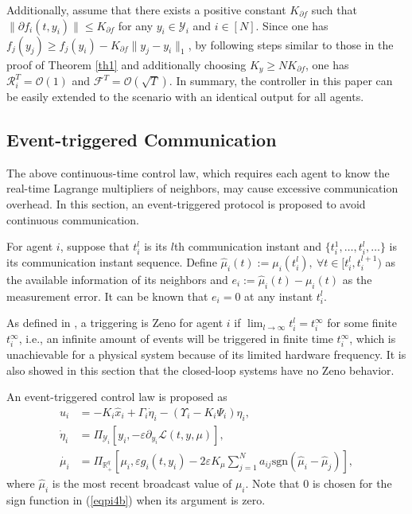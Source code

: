 \documentclass[final,5p,times,twocolumn,authoryear]{elsarticle}
\newcommand{\sign}[1]{\mathrm{sgn}(#1)}
\begin{document}
	Additionally, assume that there exists a positive constant $K_{\partial f}$ such that $\|\partial f_i(t,y_i)\|\le K_{\partial f}$ for any $y_i\in\mathcal{Y}_i$ and $i\in[N]$.
	Since one has $f_j(y_j)\ge f_j(y_i) - K_{\partial f}\|y_j-y_i\|_1$, by following steps similar to those in the proof of Theorem \ref{th1} and additionally choosing $K_y\ge NK_{\partial f}$, one has $\mathcal{R}_i^T=\mathcal{O}(1)$ and $\mathcal{F}^T = \mathcal{O}(\sqrt{T})$. In summary, the  controller in this paper can be easily extended to the scenario with an identical output for all agents.	
	
	
	
	
	
	\subsection{Event-triggered Communication}
	The above continuous-time control law, which requires each agent to know the real-time Lagrange multipliers of neighbors, may cause excessive communication overhead. 
	In this section, an event-triggered protocol is proposed to avoid continuous communication. 
	
	For agent $i$, suppose that $t_i^l$ is its $l$th communication instant and $\{t_i^1, \dots, t_i^l, \dots\}$ is its communication instant sequence. Define $\hat{\mu}_i(t)\!:=\! \mu_i(t_i^l), ~\forall t\!\in\! [t_i^l,t_i^{l+1})$ as the available information of its neighbors and $e_i\!:=\!\hat \mu_i(t)-\mu_i(t)$ as the measurement error. It can be known  that $e_i=0$ at any instant  $t_i^l$.
	
	As defined in \citet{sz2020}, a triggering is Zeno for agent $i$ if $\lim_{l\to\infty} t_i^l=t_i^\infty$ for some finite $t_i^\infty$, i.e., an infinite amount of events will be triggered in finite time $t_i^\infty$, which is unachievable for a physical system because of its limited  hardware frequency.
	It is also showed in this section that the closed-loop systems have no Zeno behavior.
	
	
	An event-triggered control law is proposed as
	\begin{subequations}\label{eqpi4}
		\begin{align}
			u_i&=-K_{i} \hat{x}_i+\Gamma_i\dot{\eta}_i - (\Upsilon_i - K_i\Psi_i)\eta_i, \label{eqpi4z}\\
			\dot{\eta}_i&=\Pi_{\mathcal{Y}_i}[y_i, -\varepsilon \partial_{y_i}\mathcal{L}(t,y,\mu)],\label{eqpi4a}\\
			\dot{\mu_i}&=\Pi_{\mathbb{R}_+^q}[\mu_i,\varepsilon g_i(t,y_i)-2\varepsilon K_\mu \sum_{j=1}^N a_{ij}\sign{\hat\mu_i-\hat\mu_j}], \label{eqpi4b}
		\end{align}
	\end{subequations}
	where $\hat\mu_i$ is the most recent broadcast value of $\mu_i$.
	Note that $0$ is chosen for the sign function in (\ref{eqpi4b}) when its argument is zero.
	
\end{document}
